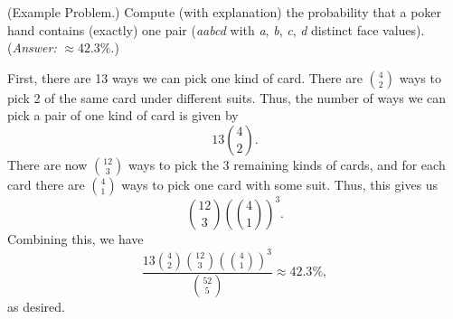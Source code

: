 \begin{mdframed}[]
    (Example Problem.) Compute (with explanation) the probability that a poker hand contains (exactly) one pair (\emph{aabcd} with \emph{a}, \emph{b}, \emph{c}, \emph{d} distinct face values). (\emph{Answer:} $\approx 42.3\%$.)

    \begin{mdframed}[]
        First, there are 13 ways we can pick one kind of card. There are $\binom{4}{2}$ ways to pick 2 of the same card under different suits. Thus, the number of ways we can pick a pair of one kind of card is given by 
        \[13\binom{4}{2}.\]
        There are now $\binom{12}{3}$ ways to pick the 3 remaining kinds of cards, and for each card there are $\binom{4}{1}$ ways to pick one card with some suit. Thus, this gives us 
        \[\binom{12}{3} \left(\binom{4}{1}\right)^3.\]
        Combining this, we have 
        \[\frac{13\binom{4}{2}\binom{12}{3} \left(\binom{4}{1}\right)^3}{\binom{52}{5}} \approx 42.3\%,\]
        as desired.  
    \end{mdframed}
\end{mdframed}

